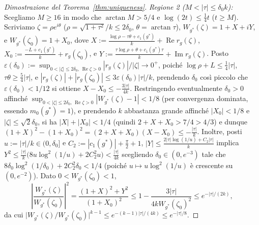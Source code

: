 \documentclass[11pt, reqno]{amsart}
\theoremstyle{remark}
\numberwithin{equation}{section}
\DeclareMathOperator{\re}{Re}
\DeclareMathOperator{\im}{Im}
\begin{document}
\begin{proof}[Dimostrazione del Teorema~\ref{thm:uniqueness}]
\emph{Regione 2 ($M < |\tau| \le \delta_0 k$):} Scegliamo $M \ge 16$ in modo che $\arctan M > 5/4$ e
$\log(2t) \le \frac{1}{4} t$ ($t \ge M$). Scriviamo $\zeta = \rho e^{i\theta}$ ($\rho = \sqrt{1+\tau^2}/k \le 2\delta_0$,
$\theta = \arctan\tau$), $W_{g^*}(\zeta) = 1 + X + i Y$, e $W_{g^*}(\zeta_0) = 1 + X_0$, dove
$X := \frac{\log\rho - \tau\theta + c_1(g^*)}{k} + \re r_g(\zeta)$,
$X_0 := \frac{-L + c_1(g^*)}{k} + r_g(\zeta_0)$, e
$Y := \frac{\tau\log\rho + \theta + c_1(g^*)\tau}{k} + \im r_g(\zeta)$.
Posto $\varepsilon(\delta_0) := \sup_{0 < |\zeta| \le 2\delta_0,\, \re\zeta > 0} |r_g(\zeta)|/|\zeta| \to 0^+$,
poiché $\log\rho + L \le \frac{1}{4}|\tau|$, $\tau\theta \ge \frac{5}{4}|\tau|$, e
$|r_g(\zeta)| + |r_g(\zeta_0)| \le 3\varepsilon(\delta_0)|\tau|/k$, prendendo $\delta_0$ così piccolo che
$\varepsilon(\delta_0) < 1/12$ si ottiene $X - X_0 \le -\frac{3|\tau|}{4k}$. Restringendo eventualmente
$\delta_0 > 0$ affinché $\sup_{0 < |\zeta| \le 2\delta_0,\, \re\zeta > 0} |W_{g^*}(\zeta) - 1| < 1/8$ (per convergenza dominata, essendo $m_0(g^*) = 1$),
e prendendo $k$ abbastanza grande affinché $|X_0| < 1/8$ e $|\zeta| \le \sqrt{2}\delta_0$, si ha
$|X|+|X_0| < 1/4$ (quindi $2+X+X_0 > 7/4 > 4/3$) e dunque $(1+X)^2 - (1+X_0)^2 = (2+X+X_0)(X-X_0) \le -\frac{|\tau|}{k}$. Inoltre, posti
$u := |\tau|/k \in (0,\delta_0]$ e $C_2 := |c_1(g^*)| + \frac{\pi}{2} + 1$,
$|Y| \le \frac{2|\tau|\log(1/u) + C_2|\tau|}{k}$ implica
$Y^2 \le \frac{|\tau|}{k}\bigl(8 u\log^2(1/u) + 2 C_2^2 u\bigr) < \frac{|\tau|}{4k}$
scegliendo $\delta_0 \in (0, e^{-3})$ tale che $8\delta_0\log^2(1/\delta_0) + 2 C_2^2\delta_0 < 1/4$
(poiché $u \mapsto u\log^2(1/u)$ è crescente su $(0, e^{-2})$). Dato $0 < W_{g^*}(\zeta_0) < 1$,
\[
\left|\frac{W_{g^*}(\zeta)}{W_{g^*}(\zeta_0)}\right|^2
= \frac{(1+X)^2 + Y^2}{(1+X_0)^2} \le 1 - \frac{3|\tau|}{4k W_{g^*}(\zeta_0)^2} \le e^{-|\tau|/(2k)},
\]
da cui $\bigl|W_{g^*}(\zeta)/W_{g^*}(\zeta_0)\bigr|^{k-1} \le e^{-(k-1)|\tau|/(4k)} \le e^{-|\tau|/8}$.


\end{proof}
\end{document}
